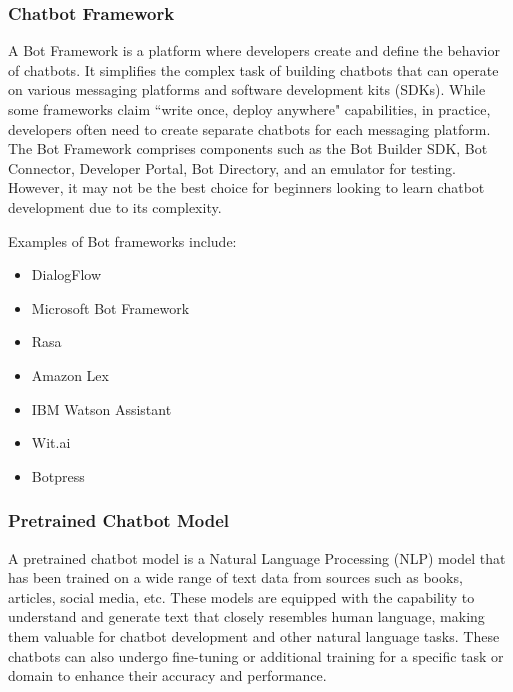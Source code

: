 \documentclass[12pt,oneside,openright,a4paper]{cpe-english-project}
\begin{document}
      \subsubsection{Chatbot Framework}
        \qquad A Bot Framework is a platform where developers create and define the behavior of chatbots. It simplifies the complex task of building chatbots that can operate on various messaging platforms and software development kits (SDKs). While some frameworks claim “write once, deploy anywhere" capabilities, in practice, developers often need to create separate chatbots for each messaging platform. The Bot Framework comprises components such as the Bot Builder SDK, Bot Connector, Developer Portal, Bot Directory, and an emulator for testing. However, it may not be the best choice for beginners looking to learn chatbot development due to its complexity.\par
        \qquad Examples of Bot frameworks include:\par
        \begin{itemize}
          \item DialogFlow
          \item Microsoft Bot Framework
          \item Rasa
          \item Amazon Lex
          \item IBM Watson Assistant
          \item Wit.ai
          \item Botpress
        \end{itemize}
      
      \subsubsection{Pretrained Chatbot Model}
        \qquad A pretrained chatbot model is a Natural Language Processing (NLP) model that has been trained on a wide range of text data from sources such as books, articles, social media, etc. These models are equipped with the capability to understand and generate text that closely resembles human language, making them valuable for chatbot development and other natural language tasks. These chatbots can also undergo fine-tuning or additional training for a specific task or domain to enhance their accuracy and performance.\par
\end{document}
